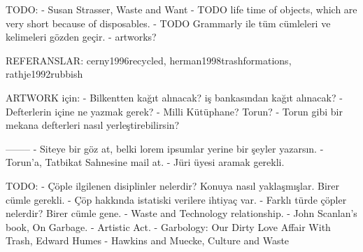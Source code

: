 TODO:
- Susan Strasser, Waste and Want
- TODO life time of objects, which are very short because of disposables.
- TODO Grammarly ile tüm cümleleri ve kelimeleri gözden geçir.
- artworks?


REFERANSLAR:
cerny1996recycled, herman1998trashformations, rathje1992rubbish



ARTWORK için:
- Bilkentten kağıt alınacak? iş bankasından kağıt alınacak?
- Defterlerin içine ne yazmak gerek?
- Milli Kütüphane? Torun?
- Torun gibi bir mekana defterleri nasıl yerleştirebilirsin?


--------
- Siteye bir göz at, belki lorem ipsumlar yerine bir şeyler yazarsın.
- Torun'a, Tatbikat Sahnesine mail at.
- Jüri üyesi aramak gerekli.


TODO:
- Çöple ilgilenen disiplinler nelerdir? Konuya nasıl yaklaşmışlar. Birer cümle gerekli.
- Çöp hakkında istatiski verilere ihtiyaç var.
- Farklı türde çöpler nelerdir? Birer cümle gene.
- Waste and Technology relationship.
- John Scanlan's book, On Garbage.
- Artistic Act.
- Garbology: Our Dirty Love Affair With Trash, Edward Humes
- Hawkins and Muecke, Culture and Waste

